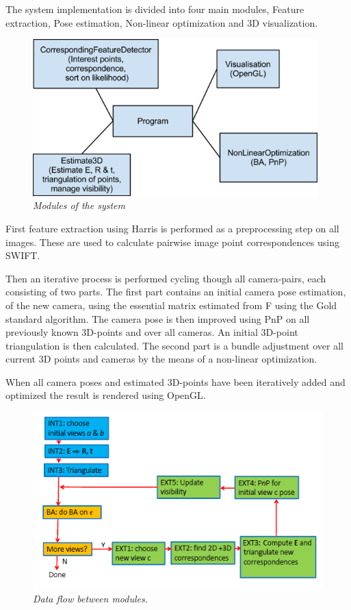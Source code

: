 The system implementation is divided into four main modules, Feature extraction, Pose estimation, Non-linear optimization and 3D visualization.

\begin{figure}[htb]
	\centering
	\includegraphics[width=110mm]{images/system_modules.png}
	\caption{\textit{Modules of the system}}
	\label{fig:block_overview2_fig}  %
\end{figure}

First feature extraction using Harris is performed as a preprocessing step on all images. These are used to calculate pairwise image point correspondences using SWIFT.

Then an iterative process is performed cycling though all camera-pairs, each consisting of two parts. The first part contains an initial camera pose estimation, of the new camera, using the essential matrix estimated from F using the Gold standard algorithm. The camera pose is then improved using PnP on all previously known 3D-points and over all cameras. An initial 3D-point triangulation is then calculated.
The second part is a bundle adjustment over all current 3D points and cameras by the means of a non-linear optimization.

When all camera poses and estimated 3D-points have been iteratively added and optimized the result is rendered using OpenGL.

\begin{figure}[htb]
	\centering
	\includegraphics[width=120mm]{images/data_flow.png}
	\caption{\textit{Data flow between modules.}}
	\label{fig:block_overview_fig}  %
\end{figure}
